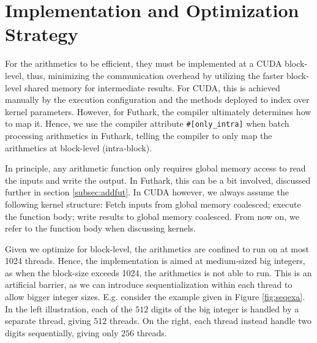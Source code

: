 \section{Implementation and Optimization Strategy}
\label{sec:strat}

For the arithmetics to be efficient, they must be implemented at a CUDA
block-level, thus, minimizing the communication overhead by utilizing the faster
block-level shared memory for intermediate results. For CUDA, this is achieved
manually by the execution configuration and the methods deployed to index over
kernel parameters. However, for Futhark, the compiler ultimately determines how
to map it. Hence, we use the compiler attribute \texttt{\#[only\_intra]} when
batch processing arithmetics in Futhark, telling the compiler to only map the
arithmetics at block-level (intra-block).

In principle, any arithmetic function only requires global memory access to read
the inputs and write the output. In Futhark, this can be a bit involved,
discussed further in section \ref{subsec:addfut}. In CUDA however, we always
assume the following kernel structure: Fetch inputs from global memory
coalesced; execute the function body; write results to global memory
coalesced. From now on, we refer to the function body when discussing kernels.

Given we optimize for block-level, the arithmetics are confined to run on at
most 1024 threads.  Hence, the implementation is aimed at medium-sized big
integers, as when the block-size exceeds 1024, the arithmetics is not able to
run. This is an artificial barrier, as we can introduce sequentialization within
each thread to allow bigger integer sizes. E.g. consider the example given in
Figure \ref{fig:seqexa}. In the left illustration, each of the $512$ digits of
the big integer is handled by a separate thread, giving $512$ threads. On the
right, each thread instead handle two digits sequentially, giving only $256$
threads.

